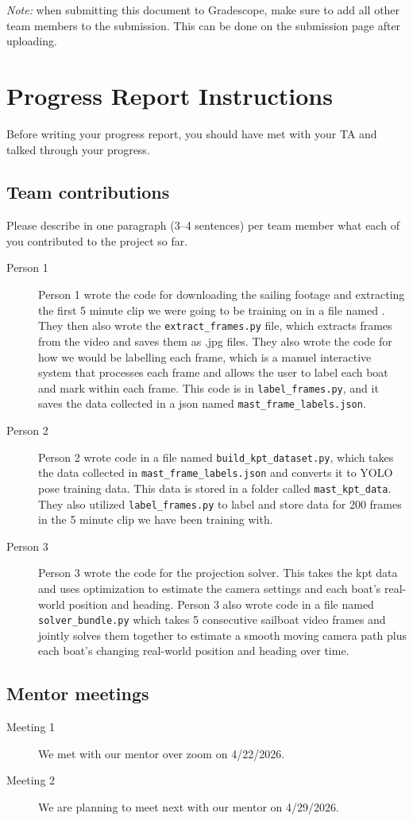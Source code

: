 \emph{Note:} when submitting this document to Gradescope, make sure to add all other team members to the submission. This can be done on the submission page after uploading.

\section*{Progress Report Instructions}

Before writing your progress report, you should have met with your TA and talked through your progress.

\subsection*{Team contributions}

Please describe in one paragraph (3--4 sentences) per team member what each of you contributed to the project so far.
\begin{description}
\item[Person 1] Person 1 wrote the code for downloading the sailing footage and extracting the first 5 minute clip we were going to be training on in a file named . They then also wrote the \texttt{extract\_frames.py} file, which extracts frames from the video and saves them as .jpg files. They also wrote the code for how we would be labelling each frame, which is a manuel interactive system that processes each frame and allows the user to label each boat and mark within each frame. This code is in \texttt{label\_frames.py}, and it saves the data collected in a json named \texttt{mast\_frame\_labels.json}.
\item[Person 2] Person 2 wrote code in a file named \texttt{build\_kpt\_dataset.py}, which takes the data collected in \texttt{mast\_frame\_labels.json} and converts it to YOLO pose training data. This data is stored in a folder called \texttt{mast\_kpt\_data}. They also utilized \texttt{label\_frames.py} to label and store data for 200 frames in the 5 minute clip we have been training with. 
\item[Person 3] Person 3 wrote the code for the projection solver. This takes the kpt data and uses optimization to estimate the camera settings and each boat’s real-world position and heading. Person 3 also wrote code in a file named \texttt{solver\_bundle.py} which takes 5 consecutive sailboat video frames and jointly solves them together to estimate a smooth moving camera path plus each boat's changing real-world position and heading over time.
\end{description}

\subsection*{Mentor meetings}
\begin{description}
    \item[Meeting 1] We met with our mentor over zoom on 4/22/2026.
    \item[Meeting 2] We are planning to meet next with our mentor on 4/29/2026.
\end{description}

